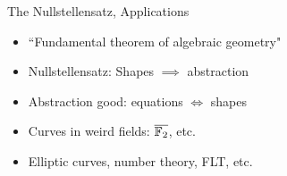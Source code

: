 \documentclass{beamer}
\begin{document}
\begin{frame}{The Nullstellensatz, Applications}
\begin{itemize}
    \item ``Fundamental theorem of algebraic geometry" \pause
    \item Nullstellensatz: Shapes $\implies$ abstraction
    \item Abstraction good: equations $\iff$ shapes \pause
    \item Curves in weird fields: $\overline{\mathbb F_2}$, etc.
    \item Elliptic curves, number theory, FLT, etc.
\end{itemize}
\end{frame}
\end{document}
